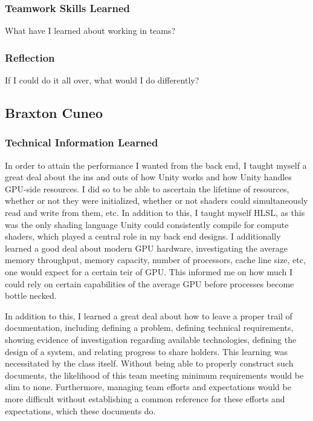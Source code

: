 \documentclass[onecolumn, draftclsnofoot,10pt, compsoc]{IEEEtran}
\begin{document}
\subsubsection{Teamwork Skills Learned}
What have I learned about working in teams?
\subsubsection{Reflection}
If I could do it all over, what would I do differently?


\subsection{Braxton Cuneo}

\subsubsection{Technical Information Learned}

In order to attain the performance I wanted from the back end, I taught myself a great deal about the ins and outs of how Unity works and how Unity handles GPU-side resources. I did so to be able to ascertain the lifetime of resources, whether or not they were initialized, whether or not shaders could simultaneously read and write from them, etc. In addition to this, I taught myself HLSL, as this was the only shading language Unity could consistently compile for compute shaders, which played a central role in my back end designs. I additionally learned a good deal about modern GPU hardware, investigating the average memory throughput, memory capacity, number of processors, cache line size, etc, one would expect for a certain teir of GPU. This informed me on how much I could rely on certain capabilities of the average GPU before processes become bottle necked.

In addition to this, I learned a great deal about how to leave a proper trail of documentation, including defining a problem, defining technical requirements, showing evidence of investigation regarding available technologies, defining the design of a system, and relating progress to share holders. This learning was necessitated by the class itself. Without being able to properly construct such documents, the likelihood of this team meeting minimum requirements would be slim to none. Furthermore, managing team efforts and expectations would be more difficult without establishing a common reference for these efforts and expectations, which these documents do.
\end{document}
